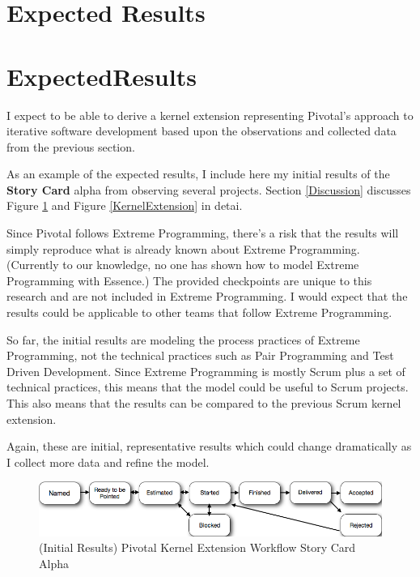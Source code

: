 \documentclass[preprint,12pt,3p]{elsarticle}
\begin{document}
\section{Expected Results}
\section{ExpectedResults}

I expect to be able to derive a kernel extension representing Pivotal's approach to iterative software development based upon the  observations and collected data from the previous section.

As an example of the expected results, I include here my initial results of the \textbf{Story Card} alpha from observing several projects. Section \ref{Discussion} discusses Figure \ref{KernelExtensionWorkflow} and Figure \ref{KernelExtension} in detai.

Since Pivotal follows Extreme Programming, there's a risk that the results will simply reproduce what is already known about Extreme Programming. (Currently to our knowledge, no one has shown how to model Extreme Programming with Essence.) The provided checkpoints are unique to this research and are not included in Extreme Programming. I would expect that the results could be applicable to other teams that follow Extreme Programming. 

So far, the initial results are modeling the process practices of Extreme Programming, not the technical practices such as Pair Programming and Test Driven Development. Since Extreme Programming is mostly Scrum plus a set of technical practices, this means that the model could be useful to Scrum projects. This also means that the results can be compared to the previous Scrum kernel extension.

Again, these are initial, representative results which could change dramatically as I collect more data and refine the model.

\begin{figure}[ht]
\includegraphics[width=6.25in]{pivotal_images/story_card_workflow}
\caption{(Initial Results) Pivotal Kernel Extension Workflow Story Card Alpha}
\label{KernelExtensionWorkflow}
\end{figure}
\end{document}
